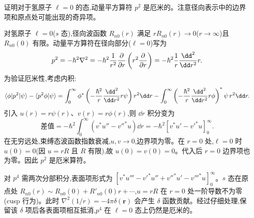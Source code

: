 \begin{question}
证明对于氢原子 $\ell=0$ 的态,动量平方算符 $p^2$ 是厄米的。注意径向表示中的边界项和原点处可能出现的奇异项。
\begin{solution}
对氢原子 $\ell=0$($s$ 态),径向波函数 $R_{n0}(r)$ 满足 $rR_{n0}(r)\to0$($r\to\infty$)且 $R_{n0}(0)$ 有限。动量平方算符在径向部分($\ell=0$)写为
\[
p^2=-\hbar^2\nabla^2=-\hbar^2{1\over r^2}{\partial\over\partial r}\left(r^2{\partial\over\partial r}\right)
=-\hbar^2{1\over r}{\dd^2\over\dd r^2}r.
\]
为验证厄米性,考虑内积:
\[
\langle\phi|p^2|\psi\rangle-\langle p^2\phi|\psi\rangle
=\int_0^\infty\phi^*\left(-{\hbar^2\over r}{\dd^2\over\dd r^2}r\psi\right)r^2\dd r
-\int_0^\infty\left(-{\hbar^2\over r}{\dd^2\over\dd r^2}r\phi\right)^*\psi\,r^2\dd r.
\]
引入 $u(r)=r\psi(r)$、$v(r)=r\phi(r)$,则 $\dd r$ 积分变为
\[
\text{差值}=-\hbar^2\int_0^\infty\left(v^*u''-v''^*u\right)\dd r
=-\hbar^2\left[v^*u'-v'^*u\right]_0^\infty.
\]
在无穷远处,束缚态波函数指数衰减,$u,v\to0$,边界项为零。在 $r=0$ 处,$\ell=0$ 时 $u(0)=0$(因 $u=rR$ 且 $R$ 有限),故 $u(0)=v(0)=0$。代入后 $r=0$ 边界项也为零。因此 $p^2$ 是厄米算符。

对 $p^4$ 需两次分部积分,表面项形式为 $[v^*u'''-v'^*u''+v''^*u'-v'''^*u]_0^\infty$。$s$ 态在原点处 $R_{n0}(r)\sim R_{n0}(0)+R'_{n0}(0)r+\cdots$,$u=rR$ 在 $r=0$ 处一阶导数不为零(cusp 行为)。此时 $\nabla^2(1/r)=-4\pi\delta(\mathbf r)$ 会产生 $\delta$ 函数贡献。经过仔细处理,保留该 $\delta$ 项后各表面项相互抵消,$p^4$ 在 $\ell=0$ 态上仍然是厄米的。
\end{solution}
\end{question}

